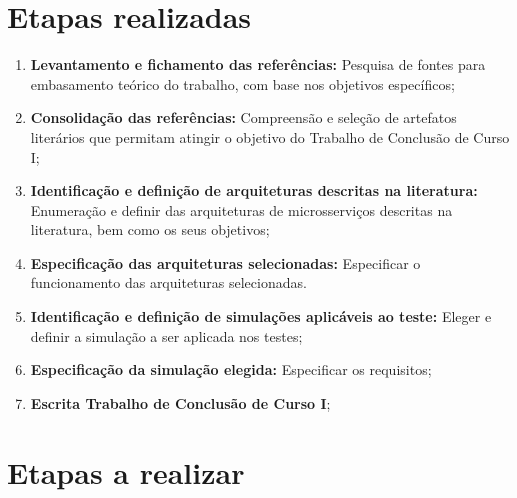 \section{Etapas realizadas}

\begin{enumerate}
  \item \textbf{Levantamento e fichamento das referências:} Pesquisa de fontes para embasamento teórico do trabalho, com base nos objetivos específicos;

  \item \textbf{Consolidação das referências:} Compreensão e seleção de artefatos literários que permitam atingir o objetivo do Trabalho de Conclusão de Curso I;

  \item \textbf{Identificação e definição de arquiteturas descritas na literatura:} Enumeração e definir das arquiteturas de microsserviços descritas na literatura, bem como os seus objetivos;

  \item \textbf{Especificação das arquiteturas selecionadas:} Especificar o funcionamento das arquiteturas selecionadas.

  \item \textbf{Identificação e definição de simulações aplicáveis ao teste:} Eleger e definir a simulação a ser aplicada nos testes;

  \item \textbf{Especificação da simulação elegida:} Especificar os requisitos;

  \item \textbf{Escrita Trabalho de Conclusão de Curso I};
\end{enumerate}

\section{Etapas a realizar}

